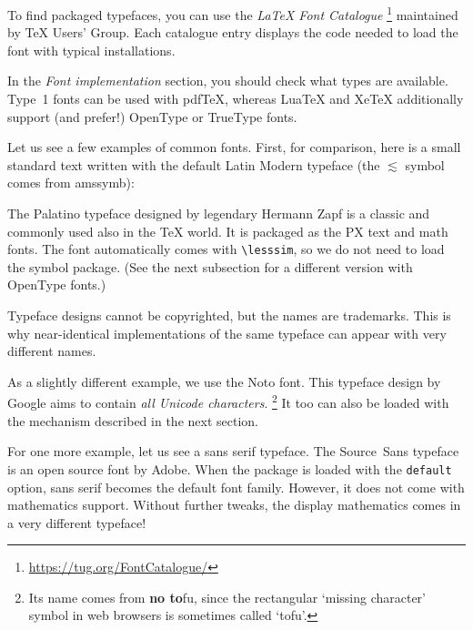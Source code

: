 To find packaged typefaces, you can use the \emph{\LaTeX{} Font Catalogue}%
\footnote{\url{https://tug.org/FontCatalogue/}}
maintained by \TeX{} Users' Group.
Each catalogue entry displays the code needed to load the font with typical installations.

In the \emph{Font implementation} section,
you should check what types are available.
Type~1 fonts can be used with pdfTeX,
whereas LuaTeX and XeTeX additionally support (and prefer!) OpenType or TrueType fonts.

Let us see a few examples of common fonts.
First, for comparison, here is a small standard text written with the default Latin Modern typeface
(the $\lesssim$ symbol comes from \textsf{amssymb}):
%

The Palatino typeface designed by legendary Hermann Zapf is a classic
and commonly used also in the \TeX{} world.
It is packaged as the PX text and math fonts.
The font automatically comes with \verb|\lesssim|, so we do not need to load the symbol package.
(See the next subsection for a different version with OpenType fonts.)
%
\begin{ExampleCode}
\usepackage{newpxtext,newpxmath}
\end{ExampleCode}
%

\begin{technote}
Typeface designs cannot be copyrighted, but the names are trademarks.
This is why near-identical implementations of the same typeface can appear with very different names.
\end{technote}

As a slightly different example, we use the Noto font.
This typeface design by Google aims to contain \emph{all Unicode characters}.%
\footnote{Its name comes from \textbf{no to}fu, since the rectangular `missing character' symbol
in web browsers is sometimes called `tofu'.}
It too can also be loaded with the mechanism described in the next section.
%
\begin{ExampleCode}
\usepackage{notomath}
\end{ExampleCode}
%

For one more example, let us see a sans serif typeface.
The Source~Sans typeface is an open source font by Adobe.
When the package is loaded with the \verb|default| option,
sans serif becomes the default font family.
However, it does not come with mathematics support.
Without further tweaks, the display mathematics comes in a very different typeface!
%
\begin{ExampleCode}
\usepackage[default]{sourcesanspro}
\usepackage{amssymb}
\end{ExampleCode}
%

